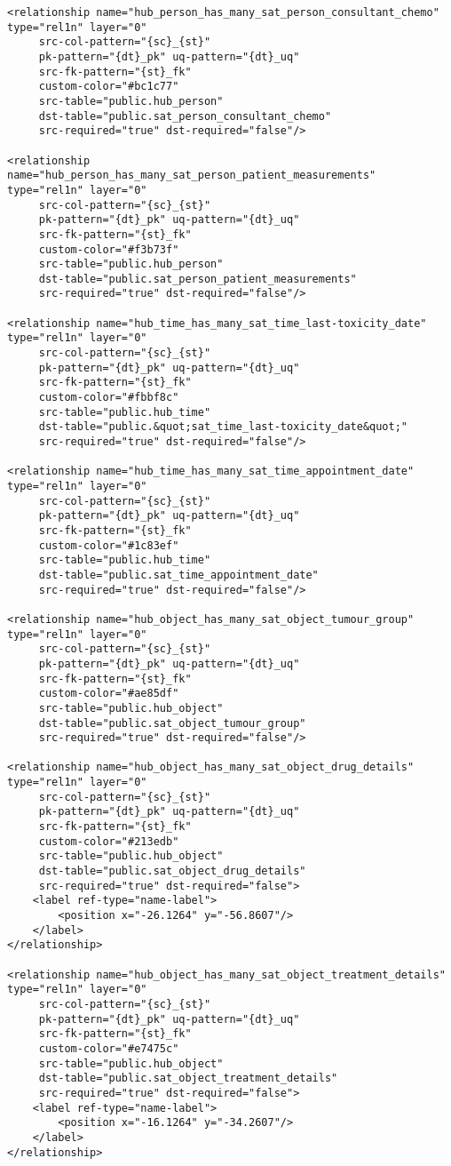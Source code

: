\begin{lstlisting}
<relationship name="hub_person_has_many_sat_person_consultant_chemo" type="rel1n" layer="0"
	 src-col-pattern="{sc}_{st}"
	 pk-pattern="{dt}_pk" uq-pattern="{dt}_uq"
	 src-fk-pattern="{st}_fk"
	 custom-color="#bc1c77"
	 src-table="public.hub_person"
	 dst-table="public.sat_person_consultant_chemo"
	 src-required="true" dst-required="false"/>

<relationship name="hub_person_has_many_sat_person_patient_measurements" type="rel1n" layer="0"
	 src-col-pattern="{sc}_{st}"
	 pk-pattern="{dt}_pk" uq-pattern="{dt}_uq"
	 src-fk-pattern="{st}_fk"
	 custom-color="#f3b73f"
	 src-table="public.hub_person"
	 dst-table="public.sat_person_patient_measurements"
	 src-required="true" dst-required="false"/>

<relationship name="hub_time_has_many_sat_time_last-toxicity_date" type="rel1n" layer="0"
	 src-col-pattern="{sc}_{st}"
	 pk-pattern="{dt}_pk" uq-pattern="{dt}_uq"
	 src-fk-pattern="{st}_fk"
	 custom-color="#fbbf8c"
	 src-table="public.hub_time"
	 dst-table="public.&quot;sat_time_last-toxicity_date&quot;"
	 src-required="true" dst-required="false"/>

<relationship name="hub_time_has_many_sat_time_appointment_date" type="rel1n" layer="0"
	 src-col-pattern="{sc}_{st}"
	 pk-pattern="{dt}_pk" uq-pattern="{dt}_uq"
	 src-fk-pattern="{st}_fk"
	 custom-color="#1c83ef"
	 src-table="public.hub_time"
	 dst-table="public.sat_time_appointment_date"
	 src-required="true" dst-required="false"/>

<relationship name="hub_object_has_many_sat_object_tumour_group" type="rel1n" layer="0"
	 src-col-pattern="{sc}_{st}"
	 pk-pattern="{dt}_pk" uq-pattern="{dt}_uq"
	 src-fk-pattern="{st}_fk"
	 custom-color="#ae85df"
	 src-table="public.hub_object"
	 dst-table="public.sat_object_tumour_group"
	 src-required="true" dst-required="false"/>

<relationship name="hub_object_has_many_sat_object_drug_details" type="rel1n" layer="0"
	 src-col-pattern="{sc}_{st}"
	 pk-pattern="{dt}_pk" uq-pattern="{dt}_uq"
	 src-fk-pattern="{st}_fk"
	 custom-color="#213edb"
	 src-table="public.hub_object"
	 dst-table="public.sat_object_drug_details"
	 src-required="true" dst-required="false">
	<label ref-type="name-label">
		<position x="-26.1264" y="-56.8607"/>
	</label>
</relationship>

<relationship name="hub_object_has_many_sat_object_treatment_details" type="rel1n" layer="0"
	 src-col-pattern="{sc}_{st}"
	 pk-pattern="{dt}_pk" uq-pattern="{dt}_uq"
	 src-fk-pattern="{st}_fk"
	 custom-color="#e7475c"
	 src-table="public.hub_object"
	 dst-table="public.sat_object_treatment_details"
	 src-required="true" dst-required="false">
	<label ref-type="name-label">
		<position x="-16.1264" y="-34.2607"/>
	</label>
</relationship>


\end{lstlisting}
